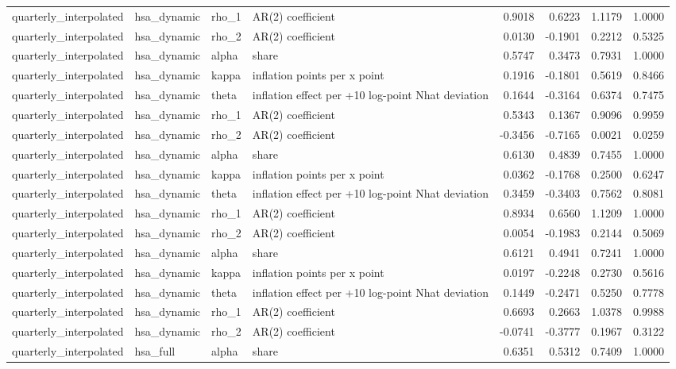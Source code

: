 \begin{tabular}{llllrrrr}
quarterly\_interpolated & hsa\_dynamic & rho\_1 & AR(2) coefficient & 0.9018 & 0.6223 & 1.1179 & 1.0000 \\
quarterly\_interpolated & hsa\_dynamic & rho\_2 & AR(2) coefficient & 0.0130 & -0.1901 & 0.2212 & 0.5325 \\
quarterly\_interpolated & hsa\_dynamic & alpha & share & 0.5747 & 0.3473 & 0.7931 & 1.0000 \\
quarterly\_interpolated & hsa\_dynamic & kappa & inflation points per x point & 0.1916 & -0.1801 & 0.5619 & 0.8466 \\
quarterly\_interpolated & hsa\_dynamic & theta & inflation effect per +10 log-point Nhat deviation & 0.1644 & -0.3164 & 0.6374 & 0.7475 \\
quarterly\_interpolated & hsa\_dynamic & rho\_1 & AR(2) coefficient & 0.5343 & 0.1367 & 0.9096 & 0.9959 \\
quarterly\_interpolated & hsa\_dynamic & rho\_2 & AR(2) coefficient & -0.3456 & -0.7165 & 0.0021 & 0.0259 \\
quarterly\_interpolated & hsa\_dynamic & alpha & share & 0.6130 & 0.4839 & 0.7455 & 1.0000 \\
quarterly\_interpolated & hsa\_dynamic & kappa & inflation points per x point & 0.0362 & -0.1768 & 0.2500 & 0.6247 \\
quarterly\_interpolated & hsa\_dynamic & theta & inflation effect per +10 log-point Nhat deviation & 0.3459 & -0.3403 & 0.7562 & 0.8081 \\
quarterly\_interpolated & hsa\_dynamic & rho\_1 & AR(2) coefficient & 0.8934 & 0.6560 & 1.1209 & 1.0000 \\
quarterly\_interpolated & hsa\_dynamic & rho\_2 & AR(2) coefficient & 0.0054 & -0.1983 & 0.2144 & 0.5069 \\
quarterly\_interpolated & hsa\_dynamic & alpha & share & 0.6121 & 0.4941 & 0.7241 & 1.0000 \\
quarterly\_interpolated & hsa\_dynamic & kappa & inflation points per x point & 0.0197 & -0.2248 & 0.2730 & 0.5616 \\
quarterly\_interpolated & hsa\_dynamic & theta & inflation effect per +10 log-point Nhat deviation & 0.1449 & -0.2471 & 0.5250 & 0.7778 \\
quarterly\_interpolated & hsa\_dynamic & rho\_1 & AR(2) coefficient & 0.6693 & 0.2663 & 1.0378 & 0.9988 \\
quarterly\_interpolated & hsa\_dynamic & rho\_2 & AR(2) coefficient & -0.0741 & -0.3777 & 0.1967 & 0.3122 \\
quarterly\_interpolated & hsa\_full & alpha & share & 0.6351 & 0.5312 & 0.7409 & 1.0000 \\

\end{tabular}
